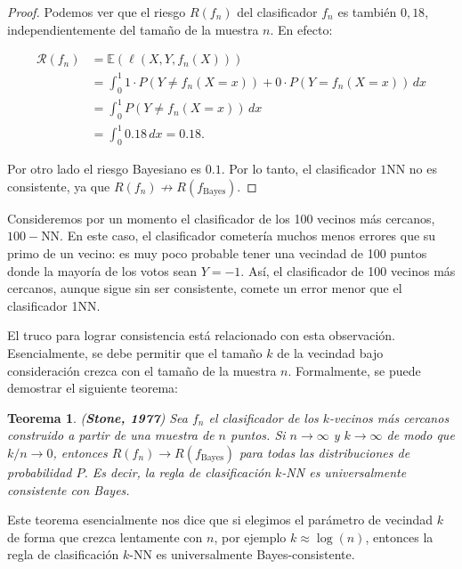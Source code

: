 \documentclass{report}
\newtheorem{thm}{Teorema}[section]
\begin{document}
\begin{proof}
Podemos ver que el riesgo \(R(f_n)\) del clasificador \(f_n\) es también $0,18$,
independientemente del tamaño de la muestra $n$. En efecto:

\[
\begin{aligned}
    \mathcal{R}(f_n) & = \mathbb{E}(\ell(X,Y,f_n(X))) \\
    & = \int_{0}^{1} 1\cdot P(Y \neq f_n(X=x)) + 0 \cdot P(Y = f_n(X=x)) \, dx \\
    & = \int_{0}^{1} P(Y \neq f_n(X=x)) \, dx \\
    & = \int_{0}^{1} 0.18 \, dx = 0.18.
\end{aligned}
\]

Por otro lado el riesgo Bayesiano es $0.1$. Por lo tanto, el clasificador $1$NN no es consistente, ya que
\(R(f_n) \not\to R(f_{\text{Bayes}})\).
\end{proof}

Consideremos por un momento el clasificador de los 100 vecinos
más cercanos, $100-$NN. En este caso, el clasificador cometería muchos menos errores que su primo de un vecino:
es muy poco probable tener una vecindad de 100 puntos donde la mayoría de los votos sean \(Y = -1\).
Así, el clasificador de 100 vecinos más cercanos, aunque sigue sin ser consistente, comete un error
menor que el clasificador 1NN.

El truco para lograr consistencia está relacionado con esta observación. Esencialmente, se debe permitir
que el tamaño \(k\) de la vecindad bajo consideración crezca con el tamaño de la muestra \(n\). Formalmente,
se puede demostrar el siguiente teorema:


\begin{thm}(\textbf{Stone, 1977})
Sea \(f_n\) el clasificador de los \(k\)-vecinos más cercanos construido
a partir de una muestra de \(n\) puntos. Si \(n \to \infty\) y \(k \to \infty\) de modo que \(k/n \to 0\),
entonces \(R(f_n) \to R(f_{\text{Bayes}})\) para todas las distribuciones de probabilidad \(P\).
Es decir, la regla de clasificación \(k\)-NN es universalmente consistente con Bayes.
\end{thm}

Este teorema esencialmente nos dice que si elegimos el parámetro de vecindad \(k\) de forma que crezca
lentamente con \(n\), por ejemplo \(k \approx \log(n)\), entonces la regla de clasificación \(k\)-NN es
universalmente Bayes-consistente.
\end{document}
